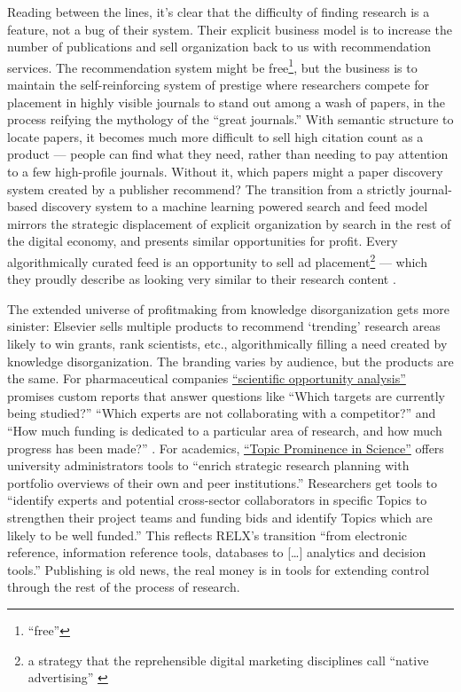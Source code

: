 Reading between the lines, it's clear that the difficulty of finding
research is a feature, not a bug of their system. Their explicit
business model is to increase the number of publications and sell
organization back to us with recommendation services. The recommendation
system might be free\footnote{``free''}, but the business is to maintain
the self-reinforcing system of prestige where researchers compete for
placement in highly visible journals to stand out among a wash of
papers, in the process reifying the mythology \citep{brembsPrestigiousScienceJournals2018}  of the ``great journals.''
With semantic structure to locate papers, it becomes much more difficult
to sell high citation count as a product --- people can find what they
need, rather than needing to pay attention to a few high-profile
journals. Without it, which papers might a paper discovery system
created by a publisher recommend? The transition from a strictly
journal-based discovery system to a machine learning powered search and
feed model mirrors the strategic displacement of explicit organization
by search in the rest of the digital economy, and presents similar
opportunities for profit. Every algorithmically curated feed is an
opportunity to sell ad placement\footnote{a strategy that the
  reprehensible digital marketing disciplines call ``native
  advertising'' \citep{dekeyzerProcessingNativeAdvertising2021, koutsopoulosNativeAdvertisementSelection2016} } --- which they
proudly describe as looking very similar to their research content \citep{springernatureBrandedContent, elsevier360AdvertisingSolutions} .

The extended universe of profitmaking from knowledge disorganization
gets more sinister: Elsevier sells multiple products to recommend
`trending' research areas likely to win grants, rank scientists, etc.,
algorithmically filling a need created by knowledge disorganization. The
branding varies by audience, but the products are the same. For
pharmaceutical companies
\href{https://www.elsevier.com/solutions/professional-services/drug-design-optimization\#opportunity}{``scientific
opportunity analysis''} promises custom reports that answer questions
like ``Which targets are currently being studied?'' ``Which experts are
not collaborating with a competitor?'' and ``How much funding is
dedicated to a particular area of research, and how much progress has
been made?'' \citep{elsevierDrugDesignOptimization} . For
academics,
\href{https://www.elsevier.com/solutions/scival/features/topic-prominence-in-science\#how}{``Topic
Prominence in Science''} offers university administrators tools to
``enrich strategic research planning with portfolio overviews of their
own and peer institutions.'' Researchers get tools to ``identify experts
and potential cross-sector collaborators in specific Topics to
strengthen their project teams and funding bids and identify Topics
which are likely to be well funded.'' \citep{elsevierTopicProminenceScienceb}  This reflects RELX's transition
``from electronic reference, information reference tools, databases to
{[}\ldots{]} analytics and decision tools.'' \citep{relxRELX2020Results2021}  Publishing is old news, the real money is
in tools for extending control through the rest of the process of
research.

